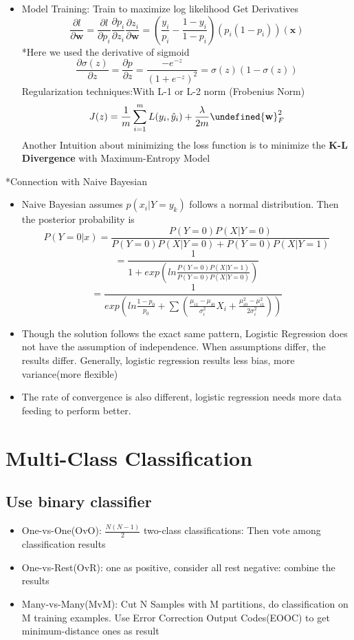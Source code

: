 \documentclass[11pt, openany]{book}              %
\let\norm\undefined %
\DeclarePairedDelimiter\norm{\lVert}{\rVert}
\begin{document}
\begin{itemize}
	\item Model Training: 
	\subitem Train to maximize log likelihood
	Get Derivatives 
	$$
	\frac{\partial l }{\partial \mathbf{w}} = \frac{\partial l }{\partial p_i}
					\frac{\partial p_i }{\partial z_i} \frac{\partial z_i }{\partial \mathbf{w}} = 
					(\frac{y_i}{p_i} - \frac{1-y_i}{1-p_i})(p_i(1-p_i))(\mathbf{x})
	$$
	*Here we used the derivative of sigmoid
	$$ \frac{\partial \sigma(z)}{\partial z} = \frac{\partial p }{\partial z} 
		= \frac{-e^{-z}}{(1+e^{-z})^2}
		= \sigma(z)(1-\sigma(z))$$
	\subitem Regularization techniques:With L-1 or L-2 norm (Frobenius Norm)
    $$J(z) = \frac{1}{m} \sum_{i=1}^m L(y_i,\hat{y}_i) + \frac{\lambda}{2m}\norm{\mathbf{w}}^2_F$$
    Another Intuition about minimizing the loss function is to minimize the \textbf{K-L Divergence} with Maximum-Entropy Model 
\end{itemize}


*Connection with Naive Bayesian

\begin{itemize}
    \item Naive Bayesian assumes $p(x_i|Y=y_k)$ follows a normal distribution. Then the posterior probability is
    $$ P(Y=0|x) = \frac{P(Y=0)P(X|Y=0)}{P(Y=0)P(X|Y=0) + P(Y=0)P(X|Y=1)} $$
    $$= \frac{1}{1+ exp(ln\frac{P(Y=0)P(X|Y=1)}{P(Y=0)P(X|Y=0)})} $$
    $$ = \frac{1}{exp(ln\frac{1-p_0}{p_0} + \sum(\frac{\mu_{i1}-\mu_{i0}}{\sigma_i^2}X_i + \frac{\mu_{i0}^2-\mu_{i1}^2}{2\sigma_i^2}))}$$
    \item Though the solution follows the exact same pattern, Logistic Regression does not have the assumption of independence. When assumptions differ, the results differ. Generally, logistic regression results less bias, more variance(more flexible)
    \item The rate of convergence is also different, logistic regression needs more data feeding to perform better.
\end{itemize}

\section{Multi-Class Classification}

\subsection{Use binary classifier}
\begin{itemize}
	\item One-vs-One(OvO): $\frac{N(N-1)}{2}$ two-class classifications: Then vote among classification results
	\item One-vs-Rest(OvR): one as positive, consider all rest negative: combine the results 
	\item Many-vs-Many(MvM): Cut N Samples with M partitions, do classification on M training examples. Use Error Correction Output Codes(EOOC) to get minimum-distance ones as result
\end{itemize}
\end{document}
